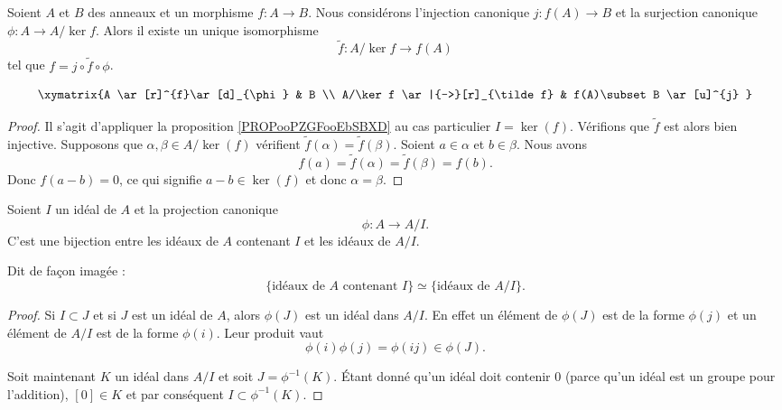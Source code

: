 \begin{proposition}   \label{PROPooJALPooHFIObB}
	Soient \( A\) et \( B\) des anneaux et un morphisme \( f\colon A\to B\). Nous considérons l'injection canonique \( j\colon f(A)\to B\) et la surjection canonique \( \phi\colon A\to A/\ker f\). Alors il existe un unique isomorphisme
	\begin{equation}
		\tilde f \colon A/\ker f\to f(A)
	\end{equation}
	tel que \( f=j\circ\tilde f\circ\phi\).

	\begin{equation}
		\xymatrix{%
		A \ar[r]^{f}\ar[d]_{\phi}       &   B                         \\
		A/\ker f    \ar|{-->}[r]_{\tilde f}   &   f(A)\subset B \ar[u]^{j}
		}
	\end{equation}
\end{proposition}

\begin{proof}
	Il s'agit d'appliquer la proposition \ref{PROPooPZGFooEbSBXD} au cas particulier \( I=\ker(f)\). Vérifions que \( \tilde f\) est alors bien injective. Supposons que \( \alpha,\beta\in A/\ker(f)\) vérifient \( \tilde f(\alpha)=\tilde f(\beta)\). Soient \( a\in \alpha\) et \( b\in \beta\). Nous avons
	\begin{equation}
		f(a)=\tilde f(\alpha)=\tilde f(\beta)=f(b).
	\end{equation}
	Donc \( f(a-b)=0\), ce qui signifie \( a-b\in\ker(f)\) et donc \( \alpha=\beta\).
\end{proof}

\begin{proposition}     \label{PropIJJIdsousphi}
	Soient \( I\) un idéal de \( A\) et la projection canonique
	\begin{equation}
		\phi\colon A\to A/I.
	\end{equation}
	C'est une bijection entre les idéaux de \( A\) contenant \( I\) et les idéaux de \( A/I\).

	Dit de façon imagée :
	\begin{equation}        \label{EqKbrizu}
		\{ \text{idéaux de } A\text{ contenant } I\}\simeq\{ \text{idéaux de } A/I \}.
	\end{equation}
\end{proposition}

\begin{proof}
	Si \( I\subset J\) et si \( J \) est un idéal de \( A\), alors \( \phi(J)\) est un idéal dans \( A/I\). En effet un élément de \( \phi(J)\) est de la forme \( \phi(j)\) et un élément de \( A/I\) est de la forme \( \phi(i)\). Leur produit vaut
	\begin{equation}
		\phi(i)\phi(j)=\phi(ij)\in\phi(J).
	\end{equation}

	Soit maintenant \( K\) un idéal dans \( A/I\) et soit \( J=\phi^{-1}(K)\). Étant donné qu'un idéal doit contenir \( 0\) (parce qu'un idéal est un groupe pour l'addition), \( [0]\in K\) et par conséquent \( I\subset\phi^{-1}(K)\).
\end{proof}

